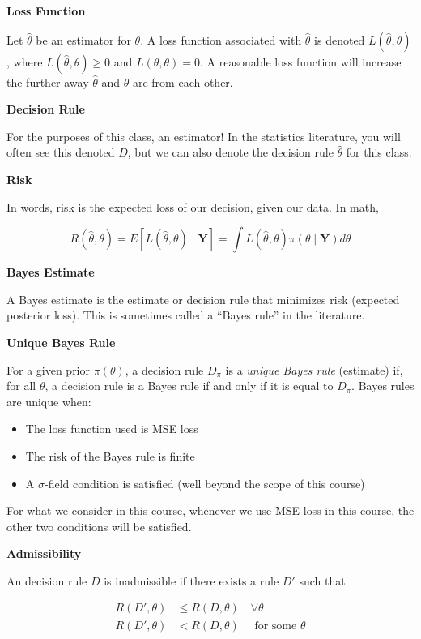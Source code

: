 \documentclass[
  letterpaper,
  DIV=11,
  numbers=noendperiod]{scrreprt}
\begin{document}
\textbf{Loss Function}

Let \(\hat{\theta}\) be an estimator for \(\theta\). A loss function
associated with \(\hat{\theta}\) is denoted \(L(\hat{\theta}, \theta)\),
where \(L(\hat{\theta}, \theta) \geq 0\) and \(L(\theta, \theta) = 0\).
A reasonable loss function will increase the further away
\(\hat{\theta}\) and \(\theta\) are from each other.

\textbf{Decision Rule}

For the purposes of this class, an estimator! In the statistics
literature, you will often see this denoted \(D\), but we can also
denote the decision rule \(\hat{\theta}\) for this class.

\textbf{Risk}

In words, risk is the expected loss of our decision, given our data. In
math,

\[
R(\hat{\theta}, \theta) = E[L(\hat{\theta}, \theta) \mid \textbf{Y}] = \int L(\hat{\theta}, \theta) \pi(\theta \mid \textbf{Y}) d\theta
\]

\textbf{Bayes Estimate}

A Bayes estimate is the estimate or decision rule that minimizes risk
(expected posterior loss). This is sometimes called a ``Bayes rule'' in
the literature.

\textbf{Unique Bayes Rule}

For a given prior \(\pi(\theta)\), a decision rule \(D_\pi\) is a
\emph{unique Bayes rule} (estimate) if, for all \(\theta\), a decision
rule is a Bayes rule if and only if it is equal to \(D_\pi\). Bayes
rules are unique when:

\begin{itemize}
\item
  The loss function used is MSE loss
\item
  The risk of the Bayes rule is finite
\item
  A \(\sigma\)-field condition is satisfied (well beyond the scope of
  this course)
\end{itemize}

For what we consider in this course, whenever we use MSE loss in this
course, the other two conditions will be satisfied.

\textbf{Admissibility}

An decision rule \(D\) is inadmissible if there exists a rule \(D'\)
such that

\begin{align*}
R(D', \theta) & \leq R(D, \theta) \quad \forall \theta \\
R(D', \theta) & < R(D, \theta) \quad \text{ for some } \theta
\end{align*}
\end{document}
